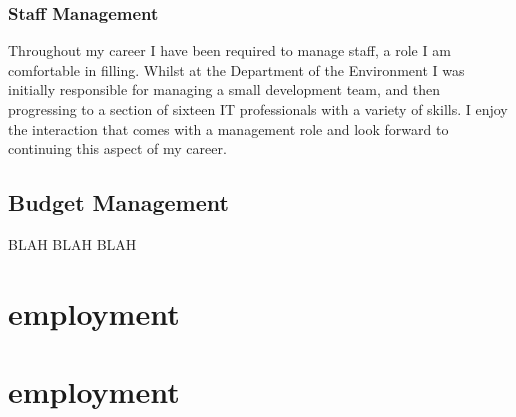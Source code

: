 \documentclass[]{friggeri-cv} %
\begin{document}
\subsubsection{Staff Management}
Throughout my career I have been required to manage staff, a role I am comfortable in filling. Whilst at the Department of the Environment I was initially responsible for managing a small development team, and then progressing to a section of sixteen IT professionals with a variety of skills. I enjoy the interaction that comes with a management role and look forward to continuing this aspect of my career.

\subsection{Budget Management}
BLAH BLAH BLAH

\section{employment}

\section{employment}
\end{document}

